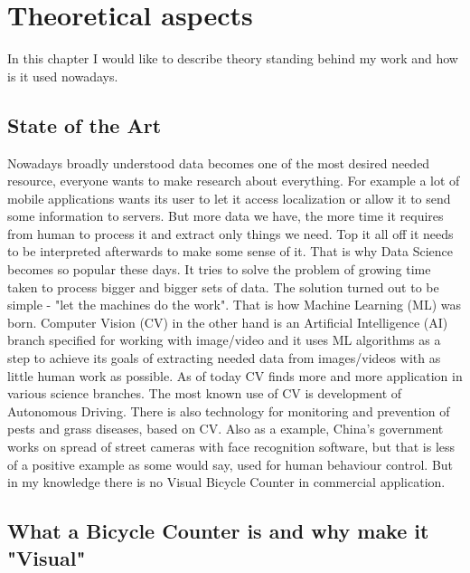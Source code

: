 \chapter{Theoretical aspects}
\label{cha:theorethicalAspects}

In this chapter I would like to describe theory standing behind my work and how is it used nowadays.


\section{State of the Art}
\label{sec:stateOfTheArt}

Nowadays broadly understood data becomes one of the most desired needed resource, everyone wants to make research about everything. For example a lot of mobile applications wants its user to let it access localization or allow it to send some information to servers. But more data we have, the more time it requires from human to process it and extract only things we need. Top it all off it needs to be interpreted afterwards to make some sense of it. That is why Data Science becomes so popular these days. It tries to solve the problem of growing time taken to process bigger and bigger sets of data. The solution turned out to be simple - "let the machines do the work". That is how Machine Learning (ML) was born. Computer Vision (CV) in the other hand is an Artificial Intelligence (AI) branch specified for working with image/video and it uses ML algorithms as a step to achieve its goals of extracting needed data from images/videos with as little human work as possible. As of today CV finds more and more application in various science branches. The most known use of CV is development of Autonomous Driving. There is also technology for monitoring and prevention of pests and grass diseases\cite{appResearch}, based on CV. Also as a example, China's government works on spread of street cameras with face recognition software, but that is less of a positive example as some would say, used for human behaviour control. But in my knowledge there is no Visual Bicycle Counter in commercial application.



\section{What a Bicycle Counter is and why make it "Visual"}
\label{sec:why}

